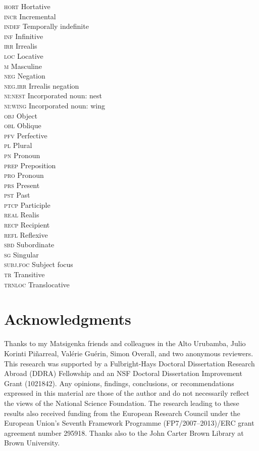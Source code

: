 \documentclass[output=paper]{LSP/langsci}
\begin{document}
\begin{multicols}{2}
\begin{tabbing}
\textsc{hort} \>  Hortative\\
\textsc{incr} \>  Incremental\\
\textsc{indef} \>  Temporally indefinite\\
\textsc{inf} \>  Infinitive\\
\textsc{irr} \>  Irrealis\\
\textsc{loc} \>  Locative\\
\textsc{m} \>  Masculine\\
\textsc{neg} \>  Negation\\
\textsc{neg.irr} \> Irrealis negation\\
\textsc{ni:nest} \>   Incorporated noun: nest\\
\textsc{ni:wing} \>    Incorporated noun: wing\\
\textsc{obj} \>  Object\\
\textsc{obl} \>  Oblique\\
\textsc{pfv} \>  Perfective\\
\textsc{pl} \>  Plural\\
\textsc{pn} \>  Pronoun\\
\textsc{prep} \>  Preposition\\
\textsc{pro} \>  Pronoun\\
\textsc{prs} \>  Present\\
\textsc{pst} \>  Past\\
\textsc{ptcp} \>  Participle\\
\textsc{real} \>  Realis\\
\textsc{recp} \>  Recipient\\
\textsc{refl} \>  Reflexive\\
\textsc{sbd} \>  Subordinate\\
\textsc{sg} \>  Singular\\
\textsc{subj.foc}  \>  Subject focus\\
\textsc{tr} \>  Transitive\\
\textsc{trnloc} \> Translocative
\end{tabbing}
\end{multicols}

\section*{Acknowledgments}
Thanks to my Matsigenka friends and colleagues in the {Alto Urubamba}, Julio Korinti Piñarreal, Valérie Guérin, Simon Overall, and two anonymous reviewers. This research was supported by a Fulbright-Hays Doctoral Dissertation Research Abroad (DDRA) Fellowship and an NSF Doctoral Dissertation Improvement Grant (1021842). Any opinions, findings, conclusions, or recommendations expressed in this material are those of the author and do not necessarily reflect the views of the National Science Foundation. The research leading to these results also received funding from the European Research Council under the European Union’s Seventh Framework Programme (FP7/2007–2013)/ERC grant agreement number 295918. Thanks also to the John Carter Brown Library at Brown University.
%

\sloppy

\printbibliography[heading=subbibliography,notkeyword=this] 
\end{document}
